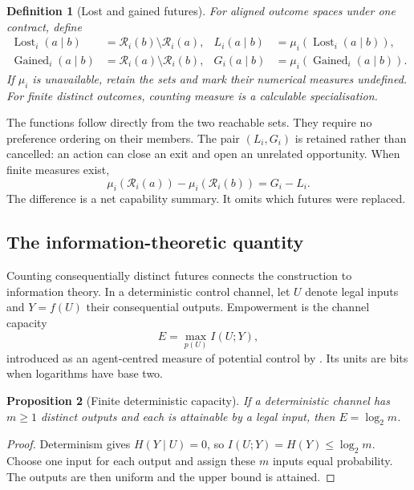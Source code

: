 \documentclass[11pt,a4paper]{article}
\newtheorem{definition}{Definition}[section]
\newtheorem{proposition}[definition]{Proposition}
\theoremstyle{remark}
\newcommand{\R}{\mathcal R}
\newcommand{\Lost}{\operatorname{Lost}}
\newcommand{\Gained}{\operatorname{Gained}}
\begin{document}
\begin{definition}[Lost and gained futures]\label{def:loss}
For aligned outcome spaces under one contract, define
\begin{align}
\Lost_i(a\mid b)&=\R_i(b)\setminus\R_i(a),&
L_i(a\mid b)&=\mu_i(\Lost_i(a\mid b)),\label{eq:loss}\\
\Gained_i(a\mid b)&=\R_i(a)\setminus\R_i(b),&
G_i(a\mid b)&=\mu_i(\Gained_i(a\mid b)).\label{eq:gain}
\end{align}
If $\mu_i$ is unavailable, retain the sets and mark their numerical measures
undefined. For finite distinct outcomes, counting measure is a calculable
specialisation.
\end{definition}

The functions follow directly from the two reachable sets. They require no
preference ordering on their members. The pair $(L_i,G_i)$ is retained rather
than cancelled: an action can close an exit and open an unrelated opportunity.
When finite measures exist,
\begin{equation}\label{eq:net}
\mu_i(\R_i(a))-\mu_i(\R_i(b))=G_i-L_i.
\end{equation}
The difference is a net capability summary. It omits which futures were replaced.

\subsection{The information-theoretic quantity}

Counting consequentially distinct futures connects the construction to
information theory. In a deterministic control channel, let $U$ denote legal
inputs and $Y=f(U)$ their consequential outputs. Empowerment is the channel
capacity
\begin{equation}\label{eq:empowerment}
E=\max_{p(U)}I(U;Y),
\end{equation}
introduced as an agent-centred measure of potential control by
\citet{klyubin2005empowerment}. Its units are bits when logarithms have base two.

\begin{proposition}[Finite deterministic capacity]\label{prop:capacity}
If a deterministic channel has $m\geq1$ distinct outputs and each is attainable
by a legal input, then $E=\log_2m$.
\end{proposition}
\begin{proof}
Determinism gives $H(Y\mid U)=0$, so $I(U;Y)=H(Y)\leq\log_2m$. Choose one input
for each output and assign these $m$ inputs equal probability. The outputs are
then uniform and the upper bound is attained.
\end{proof}
\end{document}
